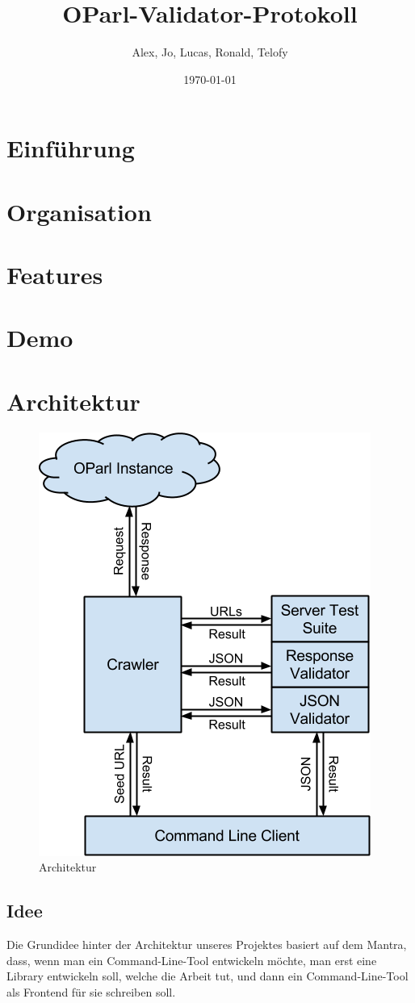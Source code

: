 \documentclass[12pt, fleqn]{scrartcl}
\title{OParl-Validator-Protokoll}
\author{Alex, Jo, Lucas, Ronald, Telofy}
\date{\today}
\begin{document}
\Maketitle

\section{Einführung}
\section{Organisation}
\section{Features}
\section{Demo}
\section{Architektur}

\begin{figure}
  \begin{center}
    \includegraphics[width=.5\textwidth]{architecture.final.png}
  \end{center}
  \caption{Architektur}
\end{figure}

\subsection{Idee}

Die Grundidee hinter der Architektur unseres Projektes basiert auf dem Mantra, dass, wenn man ein Command-Line-Tool entwickeln möchte, man erst eine Library entwickeln soll, welche die Arbeit tut, und dann ein Command-Line-Tool als Frontend für sie schreiben soll.
\end{document}
